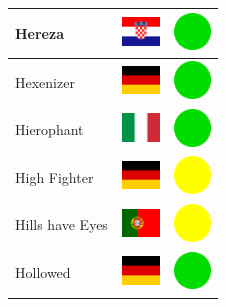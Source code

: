 \documentclass[12pt, a4paper, twoside]{report}
\begin{document}
\begin{center}
\begin{longtable}{|p{5cm}|p{2cm}|p{2cm}|}
Hereza & \includegraphics[width=1cm]{4x3/hr} & \includegraphics[width=1cm]{likes/y} \\ \hline
Hexenizer & \includegraphics[width=1cm]{4x3/de} & \includegraphics[width=1cm]{likes/y} \\ \hline
Hierophant & \includegraphics[width=1cm]{4x3/it} & \includegraphics[width=1cm]{likes/y} \\ \hline
High Fighter & \includegraphics[width=1cm]{4x3/de} & \includegraphics[width=1cm]{likes/m} \\ \hline
Hills have Eyes & \includegraphics[width=1cm]{4x3/pt} & \includegraphics[width=1cm]{likes/m} \\ \hline
Hollowed & \includegraphics[width=1cm]{4x3/de} & \includegraphics[width=1cm]{likes/y} \\ \hline

\end{longtable}
\end{center}
\end{document}
